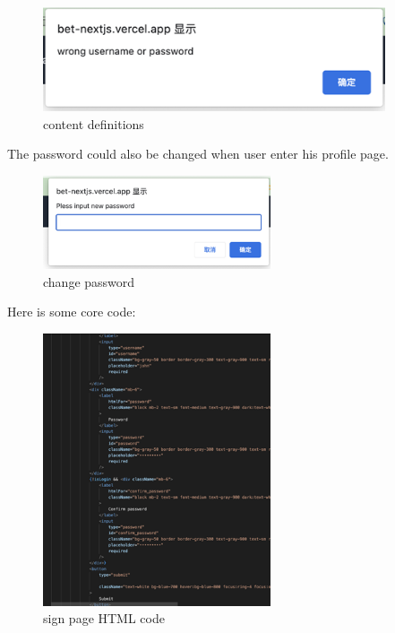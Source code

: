 \documentclass[singlecolumn]{article}
\begin{document}
\begin{figure}[H]
\begin{minipage}[c]{0.3\textwidth}
    \end{minipage}%
    \begin{minipage}[c]{0.3\textwidth}
    \centering
    \includegraphics[width=0.9\textwidth]{wrong_sign.png}
    \end{minipage}
    \caption{content definitions}
\end{figure}

The password could also be changed when user enter his profile page.

\begin{figure}[H]
    \centering
    \includegraphics[width=0.6\textwidth]{change_password.png}
    \caption{change password}
\end{figure}

Here is some core code:

\begin{figure}[H]
    \centering
    \includegraphics[width=0.6\textwidth]{sign_code1.png}
    \caption{sign page HTML code}
\end{figure}
\end{document}

